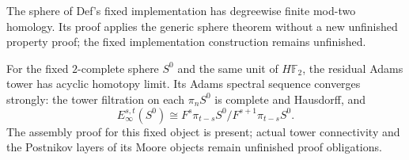 \begin{proposition}
  \label{prop:fixed-sphere-finite-mod2-type}
  \notready
  The sphere of Def's fixed implementation has degreewise finite mod-two
  homology. Its proof applies the generic sphere theorem without a new
  unfinished property proof; the fixed implementation construction remains
  unfinished.
\end{proposition}

\begin{proposition}
  \label{prop:fixed-sphere-adams-applicability}
  \notready
  For the fixed $2$-complete sphere $S^0$ and the same unit of
  $H\mathbb F_2$, the residual Adams tower has acyclic homotopy limit.
  Its Adams spectral sequence converges strongly: the tower filtration
  on each $\pi_nS^0$ is complete and Hausdorff, and
  \[
    E_\infty^{s,t}(S^0)\cong
    F^s\pi_{t-s}S^0/F^{s+1}\pi_{t-s}S^0.
  \]
  The assembly proof for this fixed object is present; actual tower
  connectivity and the Postnikov layers of its Moore objects remain
  unfinished proof obligations.
\end{proposition}

